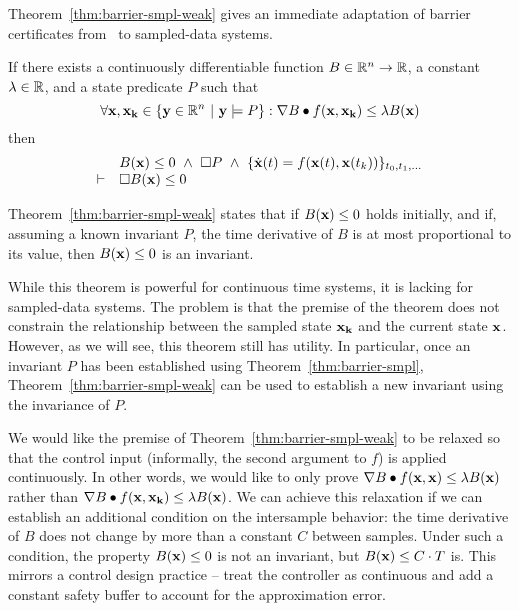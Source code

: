 Theorem~\ref{thm:barrier-smpl-weak} gives an immediate adaptation of
barrier certificates from~\cite{kong2013barrier} to sampled-data systems.

\begin{lemma}
If there exists a continuously differentiable function $B \in \mathbb{R}^n
\rightarrow \mathbb{R}$, a constant $\lambda \in \mathbb{R}$, and a state predicate $P$
such that
\[
\forall \mathbf{x}, \mathbf{x_k} \in \{\mathbf{y} \in \mathbb{R}^n~|~\mathbf{y} \models P\} : \nabla B \bullet f(\mathbf{x},\mathbf{x_k}) \leq \lambda B(\mathbf{x})
\]
then
\[
\begin{array}{cl}
&
B(\mathbf{x}) \leq 0~\wedge~
\Box{} P~\wedge~
\{\dot{\mathbf{x}}(t) = f(\mathbf{x}(t),\mathbf{x}(t_k))\}_{t_0,t_1,\ldots} \\
\vdash
&
\Box{} B(\mathbf{x}) \leq 0
\end{array}
\]
\label{thm:barrier-smpl-weak}
\end{lemma}

Theorem~\ref{thm:barrier-smpl-weak} states that if $B(\mathbf{x}) \leq 0$
holds initially, and if, assuming a known invariant $P$, the time
derivative of $B$ is at most proportional to its value, then
$B(\mathbf{x}) \leq 0$ is an invariant.

While this theorem is powerful for continuous time systems, it is lacking
for sampled-data systems. The problem is that the premise of the theorem
does not constrain the relationship between the sampled state
$\mathbf{x_k}$ and the current state $\mathbf{x}$. However, as we will
see, this theorem still has utility. In particular, once an invariant $P$
has been established using Theorem~\ref{thm:barrier-smpl},
Theorem~\ref{thm:barrier-smpl-weak} can be used to establish a new
invariant using the invariance of $P$.

We would like the premise of Theorem~\ref{thm:barrier-smpl-weak} to be
relaxed so that the control input (informally, the second argument to $f$)
is applied continuously. In other words, we would like to only prove
$\nabla B \bullet f(\mathbf{x},\mathbf{x}) \leq \lambda B(\mathbf{x})$
rather than $\nabla B \bullet f(\mathbf{x},\mathbf{x_k}) \leq \lambda
B(\mathbf{x})$. We can achieve this relaxation if we can establish an
additional condition on the intersample behavior: the time derivative of
$B$ does not change by more than a constant $C$ between samples. Under such
a condition, the property $B(\mathbf{x}) \leq 0$ is not an invariant, but
$B(\mathbf{x}) \leq C\cdot T$ is. This mirrors a control design practice
-- treat the controller as continuous and add a constant safety buffer to
account for the approximation error.


